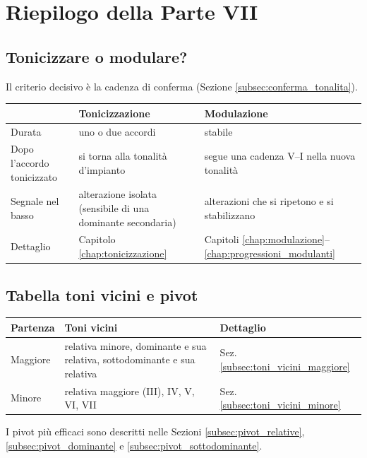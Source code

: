 \chapter{Riepilogo della Parte VII}
\label{chap:riepilogo_vii}

\section{Tonicizzare o modulare?}
\label{sec:tonicizzare_o_modulare}

Il criterio decisivo è la cadenza di conferma (Sezione \ref{subsec:conferma_tonalita}).

\begin{center}
\small
\begin{tabular}{p{3.6cm}p{4.4cm}p{4.2cm}}
\toprule
 & \textbf{Tonicizzazione} & \textbf{Modulazione} \\
\midrule
Durata & uno o due accordi & stabile \\
Dopo l'accordo tonicizzato & si torna alla tonalità d'impianto & segue una cadenza V--I nella nuova tonalità \\
Segnale nel basso & alterazione isolata (sensibile di una dominante secondaria) & alterazioni che si ripetono e si stabilizzano \\
Dettaglio & Capitolo \ref{chap:tonicizzazione} & Capitoli \ref{chap:modulazione}--\ref{chap:progressioni_modulanti} \\
\bottomrule
\end{tabular}
\end{center}

\section{Tabella toni vicini e pivot}
\label{sec:tabella_toni_vicini}

\begin{center}
\small
\begin{tabular}{lp{6cm}p{3.4cm}}
\toprule
\textbf{Partenza} & \textbf{Toni vicini} & \textbf{Dettaglio} \\
\midrule
Maggiore & relativa minore, dominante e sua relativa, sottodominante e sua relativa & Sez. \ref{subsec:toni_vicini_maggiore} \\
Minore & relativa maggiore (III), IV, V, VI, VII & Sez. \ref{subsec:toni_vicini_minore} \\
\bottomrule
\end{tabular}
\end{center}

I pivot più efficaci sono descritti nelle Sezioni \ref{subsec:pivot_relative}, \ref{subsec:pivot_dominante} e \ref{subsec:pivot_sottodominante}.
